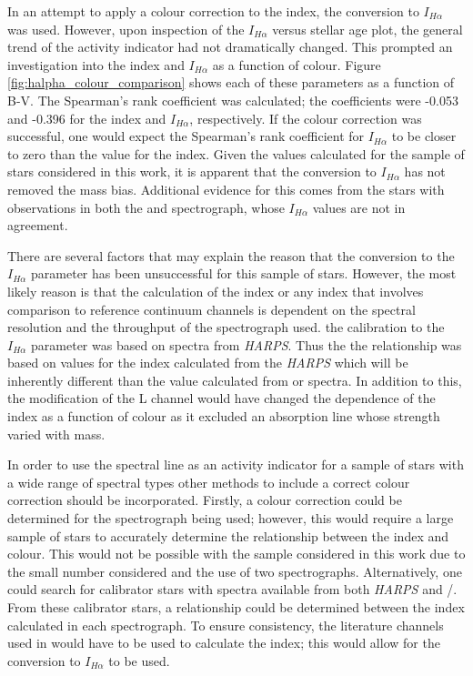 In an attempt to apply a colour correction to the \Halpha index, the conversion to $I_{H\alpha}$ \citep{Gomes_da_Silva_etal_2014} was used. However, upon inspection of the $I_{H\alpha}$ versus stellar age plot, the general trend of the activity indicator had not dramatically changed. This prompted an investigation into the \Halpha index and $I_{H\alpha}$ as a function of colour. Figure \ref{fig:halpha_colour_comparison} shows each of these parameters as a function of B-V. The Spearman's rank coefficient was calculated; the coefficients were -0.053 and -0.396 for the \Halpha index and $I_{H\alpha}$, respectively. If the colour correction was successful, one would expect the Spearman's rank coefficient for $I_{H\alpha}$ to be closer to zero than the value for the \Halpha index. Given the values calculated for the sample of stars considered in this work, it is apparent that the conversion to $I_{H\alpha}$ has not removed the mass bias. Additional evidence for this comes from the stars with observations in both the \esp and \narval spectrograph, whose $I_{H\alpha}$ values are not in agreement.

There are several factors that may explain the reason that the conversion to the $I_{H\alpha}$ parameter has been unsuccessful for this sample of stars. However, the most likely reason is that the calculation of the \Halpha index or any index that involves comparison to reference continuum channels is dependent on the spectral resolution and the throughput of the spectrograph used. the calibration to the $I_{H\alpha}$ parameter was based on spectra from \textit{HARPS}. Thus the the relationship was based on values for the \Halpha index calculated from the \textit{HARPS} which will be inherently different than the value calculated from \esp or \narval spectra. In addition to this, the modification of the L channel would have changed the dependence of the \Halpha index as a function of colour as it excluded an absorption line whose strength varied with mass.

In order to use the \Halpha spectral line as an activity indicator for a sample of stars with a wide range of spectral types other methods to include a correct colour correction should be incorporated. Firstly, a colour correction could be determined for the spectrograph being used; however, this would require a large sample of stars to accurately determine the relationship between the \Halpha index and colour. This would not be possible with the sample considered in this work due to the small number considered and the use of two spectrographs. Alternatively, one could search for calibrator stars with spectra available from both \textit{HARPS} and \esp/\narval. From these calibrator stars, a relationship could be determined between the \Halpha index calculated in each spectrograph. To ensure consistency, the literature channels used in \citet{Gomes_da_Silva_etal_2014} would have to be used to calculate the \Halpha index; this would allow for the conversion to $I_{H\alpha}$ to be used.

